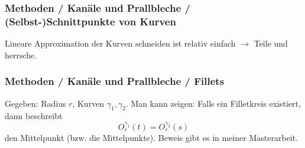 \documentclass[8pt, aspectratio=169]{beamer}
\begin{document}
\begin{frame}
	\frametitle{Methoden / Kanäle und Prallbleche / (Selbst-)Schnittpunkte von Kurven}
	\vspace{-0.5cm}\hspace{-0.5cm}
	\begin{minipage}[t]{\textwidth}
		Lineare Approximation der Kurven schneiden ist relativ einfach $\rightarrow$ Teile und herrsche.
		\begin{figure}[H]
			\centering
			
		\end{figure}
	\end{minipage}
\end{frame}

\begin{frame}
	\frametitle{Methoden / Kanäle und Prallbleche / Fillets}
	\vspace{-0.5cm}\hspace{-0.5cm}
	\begin{minipage}[t]{\textwidth}
		Gegeben: Radius $r$, Kurven $\gamma_1, \gamma_2$. Man kann zeigen: Falls ein Filletkreis existiert, dann beschreibt
			$$ O^{\gamma_1}_r(t) = O^{\gamma_2}_r(s)$$
		den Mittelpunkt (bzw. die Mittelpunkte). Beweis gibt es in meiner Masterarbeit.
		\begin{figure}[H]
			\centering
			
			\label{fig:filletconstruction}
		\end{figure}
		\begin{figure}[H]
			\centering
			
		\end{figure}
	\end{minipage}
\end{frame}
\end{document}
